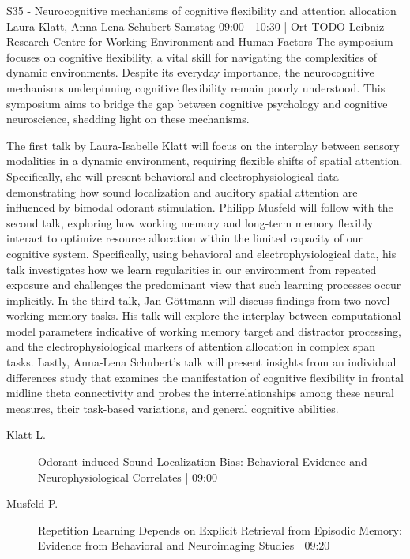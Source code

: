 
            \begin{symposium}
            {S35 - Neurocognitive mechanisms of cognitive flexibility and attention allocation }
            {Laura Klatt, Anna-Lena Schubert}
            {Samstag 09:00 - 10:30 | Ort TODO}
            {Leibniz Research Centre for Working Environment and Human Factors}
            The symposium focuses on cognitive flexibility, a vital skill for navigating the complexities of dynamic environments. Despite its everyday importance, the neurocognitive mechanisms underpinning cognitive flexibility remain poorly understood. This symposium aims to bridge the gap between cognitive psychology and cognitive neuroscience, shedding light on these mechanisms.

The first talk by Laura-Isabelle Klatt will focus on the interplay between sensory modalities in a dynamic environment, requiring flexible shifts of spatial attention. Specifically, she will present behavioral and electrophysiological data demonstrating how sound localization and auditory spatial attention are influenced by bimodal odorant stimulation. Philipp Musfeld will follow with the second talk, exploring how working memory and long-term memory flexibly interact to optimize resource allocation within the limited capacity of our cognitive system. Specifically, using behavioral and electrophysiological data, his talk investigates how we learn regularities in our environment from repeated exposure and challenges the predominant view that such learning processes occur implicitly. In the third talk, Jan Göttmann will discuss findings from two novel working memory tasks. His talk will explore the interplay between computational model parameters indicative of working memory target and distractor processing, and the electrophysiological markers of attention allocation in complex span tasks. Lastly, Anna-Lena Schubert's talk will present insights from an individual differences study that examines the manifestation of cognitive flexibility in frontal midline theta connectivity and probes the interrelationships among these neural measures, their task-based variations, and general cognitive abilities.
            \begin{description}    
            
                \item [ Klatt L.] Odorant-induced Sound Localization Bias: Behavioral Evidence and Neurophysiological Correlates \textcolor{mygray}{ | 09:00}    
                
                \item [ Musfeld P.] Repetition Learning Depends on Explicit Retrieval from Episodic Memory: Evidence from Behavioral and Neuroimaging Studies \textcolor{mygray}{ | 09:20}    
                

\end{description}
\end{symposium}
